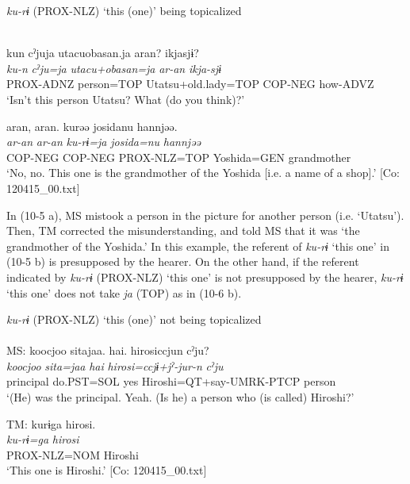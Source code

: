 \ea\label{ex:10.5}   \textit{ku-rɨ} (PROX-NLZ) ‘this (one)’ being topicalized\\\\
  \begin{xlist}[b. TM:]
   \glll kun  cˀjuja  utacuobasan.ja  aran?  ikjasjɨ?\\
      \textit{ku-n}  \textit{cˀju=ja}  \textit{utacu+obasan=ja}  \textit{ar-an}  \textit{ikja-sjɨ}\\
      PROX-ADNZ  person=TOP  Utatsu+old.lady=TOP  COP-NEG  how-ADVZ\\
      \glt ‘Isn’t this person Utatsu? What (do you think)?’

    \glll    aran,  aran.  kurəə  josidanu  hannjəə.\\
      \textit{ar-an}  \textit{ar-an}  \textit{ku-rɨ=ja}  \textit{josida=nu}  \textit{hannjəə}\\
      COP-NEG  COP-NEG  PROX-NLZ=TOP  Yoshida=GEN  grandmother\\
      \glt       ‘No, no. This one is the grandmother of the Yoshida [i.e. a name of a shop].’ [Co: 120415\_00.txt]
  \end{xlist}
\z

In (10-5 a), MS mistook a person in the picture for another person (i.e. ‘Utatsu’). Then, TM corrected the misunderstanding, and told MS that it was ‘the grandmother of the Yoshida.’ In this example, the referent of \textit{ku-rɨ} ‘this one’ in (10-5 b) is presupposed by the hearer. On the other hand, if the referent indicated by \textit{ku-rɨ} (PROX-NLZ) ‘this one’ is not presupposed by the hearer, \textit{ku-rɨ} ‘this one’ does not take \textit{ja} (TOP) as in (10-6 b).

\ea\label{ex:10.6}   \textit{ku-rɨ} (PROX-NLZ) ‘this (one)’ not being topicalized\\\\
  \ea MS: \glll {\textbar}koocjoo  sita{\textbar}jaa.  {\textbar}hai{\textbar}.  hirosiccjun  cˀju?\\
      \textit{koocjoo}  \textit{sita=jaa}  \textit{hai}  \textit{hirosi=ccjɨ+jˀ-jur-n}  \textit{cˀju}\\
      principal  do.PST=SOL  yes  Hiroshi=QT+say-UMRK-PTCP  person\\
      \glt ‘(He) was the principal. Yeah. (Is he) a person who (is called) Hiroshi?’

  \ex  TM: \glll    kurɨga  hirosi.\\
      \textit{ku-rɨ=ga}  \textit{hirosi}\\
      PROX-NLZ=NOM  Hiroshi\\
      \glt       ‘This one is Hiroshi.’ [Co: 120415\_00.txt]
    \z
\z

